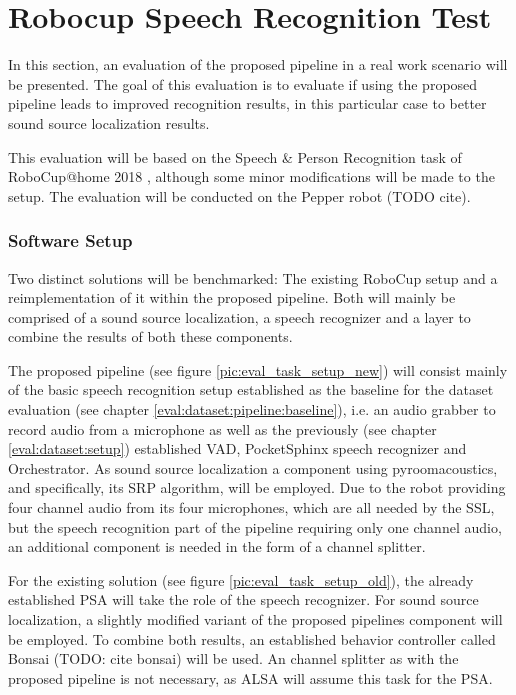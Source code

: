 
\section{Robocup Speech Recognition Test}
In this section, an evaluation of the proposed pipeline in a real work scenario will be presented.
The goal of this evaluation is to evaluate if using the proposed pipeline leads to improved recognition results, in this particular case to better sound source localization results.

This evaluation will be based on the Speech \& Person Recognition task of RoboCup@home 2018 \cite{speechrec_2018}, although some minor modifications will be made to the setup.
The evaluation will be conducted on the Pepper robot (TODO cite).

\subsubsection{Software Setup}
Two distinct solutions will be benchmarked:
The existing RoboCup setup and a reimplementation of it within the proposed pipeline.
Both will mainly be comprised of a sound source localization, a speech recognizer and a layer to combine the results of both these components.

The proposed pipeline (see figure \ref{pic:eval_task_setup_new}) will consist mainly of the basic speech recognition setup established as the baseline for the dataset evaluation (see chapter \ref{eval:dataset:pipeline:baseline}), i.e. an audio grabber to record audio from a microphone as well as the previously (see chapter \ref{eval:dataset:setup}) established VAD, PocketSphinx speech recognizer and Orchestrator.
As sound source localization a component using pyroomacoustics, and specifically, its SRP algorithm, will be employed.
Due to the robot providing four channel audio from its four microphones, which are all needed by the SSL, but the speech recognition part of the pipeline requiring only one channel audio, an additional component is needed in the form of a channel splitter.

For the existing solution (see figure \ref{pic:eval_task_setup_old}), the already established PSA will take the role of the speech recognizer.
For sound source localization, a slightly modified variant of the proposed pipelines component will be employed.
To combine both results, an established behavior controller called Bonsai (TODO: cite bonsai) will be used.
An channel splitter as with the proposed pipeline is not necessary, as ALSA will assume this task for the PSA.

